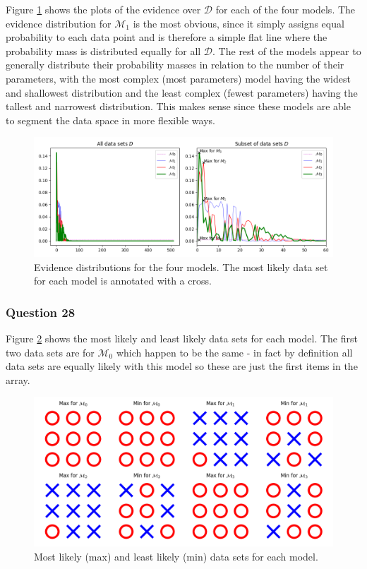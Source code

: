 \documentclass[10pt, a4paper, twocolumn]{article} %
\begin{document}
Figure \ref{fig:q27} shows the plots of the evidence over $\mathcal{D}$ for each of the four models. The evidence distribution for $\mathcal{M}_1$ is the most obvious, since it simply assigns equal probability to each data point and is therefore a simple flat line where the probability mass is distributed equally for all $\mathcal{D}$. The rest of the models appear to generally distribute their probability masses in relation to the number of their parameters, with the most complex (most parameters) model having the widest and shallowest distribution and the least complex (fewest parameters) having the tallest and narrowest distribution. This makes sense since these models are able to segment the data space in more flexible ways.

\begin{figure}[htb]
\centerline{\includegraphics[width=\linewidth]{q27.png}}
\caption{Evidence distributions for the four models. The most likely data set for each model is annotated with a cross.}
\label{fig:q27}
\end{figure}

\subsubsection*{Question 28}

Figure \ref{fig:q28} shows the most likely and least likely data sets for each model. The first two data sets are for $\mathcal{M_0}$ which happen to be the same - in fact by definition all data sets are equally likely with this model so these are just the first items in the array.

\begin{figure}[htb]
\centerline{\includegraphics[width=\linewidth]{q28.png}}
\caption{Most likely (max) and least likely (min) data sets for each model.}
\label{fig:q28}
\end{figure}
\end{document}
